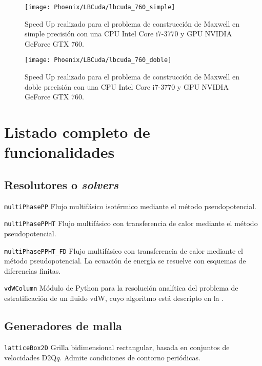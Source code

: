 \begin{figure}[ht]
	\centering
	\texttt{[image: Phoenix/LBCuda/lbcuda\_760\_simple]}
	\caption{Speed Up realizado para el problema de construcci\'on de Maxwell en simple precisi\'on con una CPU Intel Core i7-3770 y GPU NVIDIA GeForce GTX 760.}
	\label{fig:lbcuda_760_simple}
\end{figure}

\begin{figure}[ht]
	\centering
	\texttt{[image: Phoenix/LBCuda/lbcuda\_760\_doble]}
	\caption{Speed Up realizado para el problema de construcci\'on de Maxwell en doble precisi\'on con una CPU Intel Core i7-3770 y GPU NVIDIA GeForce GTX 760.}
	\label{fig:lbcuda_760_doble}
\end{figure}
\FloatBarrier



\section{Listado completo de funcionalidades}

\subsection{Resolutores o \emph{solvers}}

\texttt{multiPhasePP}\: Flujo multif\'asico isot\'ermico mediante el m\'etodo pseudopotencial.
\medskip

\texttt{multiPhasePPHT}\: Flujo multif\'asico con transferencia de calor mediante el m\'etodo pseudopotencial.
\medskip

\texttt{multiPhasePPHT\_FD}\: Flujo multif\'asico con transferencia de calor mediante el m\'etodo pseudopotencial. La ecuaci\'on de energ\'ia se resuelve con esquemas de diferencias finitas.
\medskip

\texttt{vdWColumn}\: M\'odulo de Python para la resoluci\'on anal\'itica del problema de estratificaci\'on de un fluido vdW, cuyo algoritmo est\'a descripto en la .
\medskip



\subsection{Generadores de malla}

\texttt{latticeBox2D}\: Grilla bidimensional rectangular, basada en conjuntos de velocidades D2Q$q$. Admite condiciones de contorno peri\'odicas.
\medskip

